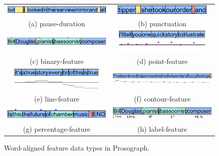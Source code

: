 \begin{figure}
\begin{tabular}{cc}
  \includegraphics[height=4.5mm]{img/prosograph_datatypes/pause.png} &   \includegraphics[height=4.5mm]{img/prosograph_datatypes/punctuation.png} \\
(a) pause-duration & (b) punctuation\\[6pt]
 \includegraphics[height=4.5mm]{img/prosograph_datatypes/binary.png} &   \includegraphics[height=11mm]{img/prosograph_datatypes/point.png} \\
(c) binary-feature & (d) point-feature\\[6pt]
 \includegraphics[height=11mm]{img/prosograph_datatypes/line.png} &   \includegraphics[height=8mm]{img/prosograph_datatypes/curve.png} \\
(e) line-feature & (f) contour-feature\\[6pt]
 \includegraphics[height=6mm]{img/prosograph_datatypes/percentage.png} &   \includegraphics[height=7mm]{img/prosograph_datatypes/label.png} \\
(g) percentage-feature & (h) label-feature \\[6pt]
\end{tabular}

\caption{Word-aligned feature data types in Prosograph.}
\label{corpusWorks:fig:prosdatatypes}
\end{figure}

